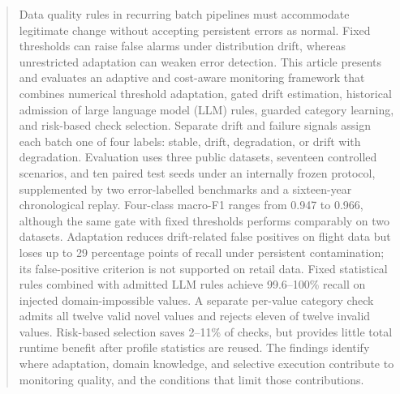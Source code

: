 \begin{abstract}
Data quality rules in recurring batch pipelines must accommodate legitimate change without accepting persistent errors as normal. Fixed thresholds can raise false alarms under distribution drift, whereas unrestricted adaptation can weaken error detection. This article presents and evaluates an adaptive and cost-aware monitoring framework that combines numerical threshold adaptation, gated drift estimation, historical admission of large language model (LLM) rules, guarded category learning, and risk-based check selection. Separate drift and failure signals assign each batch one of four labels: stable, drift, degradation, or drift with degradation. Evaluation uses three public datasets, seventeen controlled scenarios, and ten paired test seeds under an internally frozen protocol, supplemented by two error-labelled benchmarks and a sixteen-year chronological replay. Four-class macro-F1 ranges from 0.947 to 0.966, although the same gate with fixed thresholds performs comparably on two datasets. Adaptation reduces drift-related false positives on flight data but loses up to 29 percentage points of recall under persistent contamination; its false-positive criterion is not supported on retail data. Fixed statistical rules combined with admitted LLM rules achieve 99.6--100\% recall on injected domain-impossible values. A separate per-value category check admits all twelve valid novel values and rejects eleven of twelve invalid values. Risk-based selection saves 2--11\% of checks, but provides little total runtime benefit after profile statistics are reused. The findings identify where adaptation, domain knowledge, and selective execution contribute to monitoring quality, and the conditions that limit those contributions.
\end{abstract}
